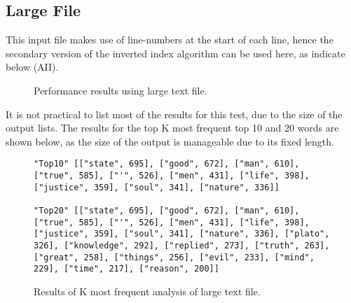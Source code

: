 \documentclass[journal,10pt]{IEEEtran}
\begin{document}
\subsection{Large File}

This input file makes use of line-numbers at the start of each line, hence the secondary version of the inverted index algorithm can be used here, as indicate below (AII).
\begin{figure}[H]
    \centering
    \caption{Performance results using large text file.}
    \label{fig:my_label}
\end{figure}

\clearpage
It is not practical to list most of the results for this test, due to the size of the output lists. The results for the top K most frequent top 10 and 20 words are shown below, as the size of the output is manageable due to its fixed length.


\begin{figure}[H]
    \centering
    \begin{lstlisting}
"Top10" [["state", 695], ["good", 672], ["man", 610], ["true", 585], ["'", 526], ["men", 431], ["life", 398], ["justice", 359], ["soul", 341], ["nature", 336]]

"Top20" [["state", 695], ["good", 672], ["man", 610], ["true", 585], ["'", 526], ["men", 431], ["life", 398], ["justice", 359], ["soul", 341], ["nature", 336], ["plato", 326], ["knowledge", 292], ["replied", 273], ["truth", 263], ["great", 258], ["things", 256], ["evil", 233], ["mind", 229], ["time", 217], ["reason", 200]]
\end{lstlisting}

    \caption{Results of K most frequent analysis of large text file.}
\end{figure}
\end{document}
